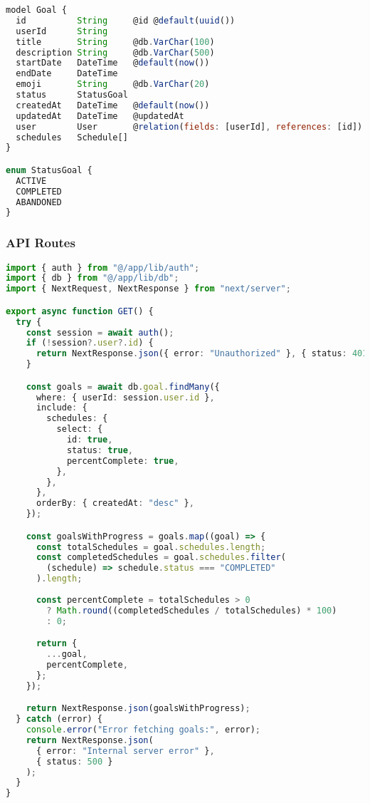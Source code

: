 \begin{lstlisting}[language=JavaScript, caption=prisma/schema.prisma - Goal Model]
model Goal {
  id          String     @id @default(uuid())
  userId      String
  title       String     @db.VarChar(100)
  description String     @db.VarChar(500)
  startDate   DateTime   @default(now())
  endDate     DateTime
  emoji       String     @db.VarChar(20)
  status      StatusGoal
  createdAt   DateTime   @default(now())
  updatedAt   DateTime   @updatedAt
  user        User       @relation(fields: [userId], references: [id])
  schedules   Schedule[]
}

enum StatusGoal {
  ACTIVE
  COMPLETED
  ABANDONED
}
\end{lstlisting}

\subsubsection{API Routes}

\begin{lstlisting}[language=TypeScript, caption=app/api/goals/route.ts - Goals API]
import { auth } from "@/app/lib/auth";
import { db } from "@/app/lib/db";
import { NextRequest, NextResponse } from "next/server";

export async function GET() {
  try {
    const session = await auth();
    if (!session?.user?.id) {
      return NextResponse.json({ error: "Unauthorized" }, { status: 401 });
    }

    const goals = await db.goal.findMany({
      where: { userId: session.user.id },
      include: {
        schedules: {
          select: {
            id: true,
            status: true,
            percentComplete: true,
          },
        },
      },
      orderBy: { createdAt: "desc" },
    });

    const goalsWithProgress = goals.map((goal) => {
      const totalSchedules = goal.schedules.length;
      const completedSchedules = goal.schedules.filter(
        (schedule) => schedule.status === "COMPLETED"
      ).length;
      
      const percentComplete = totalSchedules > 0 
        ? Math.round((completedSchedules / totalSchedules) * 100) 
        : 0;

      return {
        ...goal,
        percentComplete,
      };
    });

    return NextResponse.json(goalsWithProgress);
  } catch (error) {
    console.error("Error fetching goals:", error);
    return NextResponse.json(
      { error: "Internal server error" },
      { status: 500 }
    );
  }
}
\end{lstlisting}

